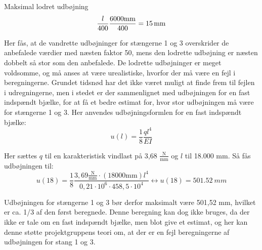 Maksimal lodret udbøjning
\begin{equation}
\frac{l}{400}
\\
\frac{6000 \text{mm}}{400} = \SI{15}{mm}
\end{equation}

Her fås, at de vandrette udbøjninger for stængerne 1 og 3 overskrider de anbefalede værdier med næsten faktor 50, mens den lodrette udbøjning er næsten dobbelt så stor som den anbefalede. De lodrette udbøjninger er meget voldsomme, og må anses at være urealistiske, hvorfor der må være en fejl i beregningerne. Grundet tidsnød har det ikke været muligt at finde frem til fejlen i udregningerne, men i stedet er der sammenlignet med udbøjningen for en fast indspændt bjælke, for at få et bedre estimat for, hvor stor udbøjningen må være for stængerne 1 og 3. 
\newline \indent{     }  Her anvendes udbøjningsformlen for en fast indspændt bjælke:
\begin{equation}
u(l)=\frac{1}{8} \frac{ql^4}{EI}
\end{equation}

Her sættes $q$ til en karakteristisk vindlast på 3,68 $\frac{\text{N}}{\text{mm}}$ og $l$ til 18.000 mm. Så fås udbøjningen til: 
\begin{equation}
u(18) = \frac{1}{8} \frac{3,69\frac{\text{N}}{\text{mm}} \cdot (18000 \text{mm})l^4}{0,21 \cdot 10^6 \cdot 458,5 \cdot 10^4} \leftrightarrow u(18) = \SI{501,52}{mm}
\end{equation}

Udbøjningen for stængerne 1 og 3 bør derfor maksimalt være 501,52 mm, hvilket er ca. 1/3 af den først beregnede. Denne beregning kan dog ikke bruges, da der ikke er tale om en fast indspændt bjælke, men blot give et estimat, og her kan denne støtte projektgruppens teori om, at der er en fejl beregningerne af udbøjningen for stang 1 og 3.

